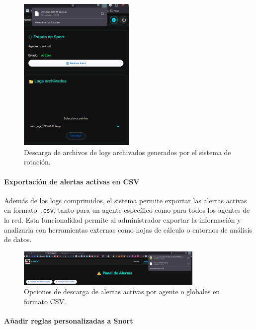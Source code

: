 \documentclass[11pt,a4paper,twoside]{report}
\begin{document}
\begin{figure}[H]
	\centering
	\includegraphics[width=0.5\textwidth]{pruebas/3.png}
	\caption{Descarga de archivos de logs archivados generados por el sistema de rotación.}
	\label{fig:descarga_logs_archivados}
\end{figure}

\paragraph{Exportación de alertas activas en CSV}

Además de los logs comprimidos, el sistema permite exportar las alertas activas en formato \texttt{.csv}, tanto para un agente específico como para todos los agentes de la red. Esta funcionalidad permite al administrador exportar la información y analizarla con herramientas externas como hojas de cálculo o entornos de análisis de datos.

\begin{figure}[H]
	\centering
	\includegraphics[width=0.8\textwidth]{pruebas/4.png}
	\caption{Opciones de descarga de alertas activas por agente o globales en formato CSV.}
	\label{fig:descarga_alertas_csv}
\end{figure}

\paragraph{Añadir reglas personalizadas a Snort}
\end{document}
